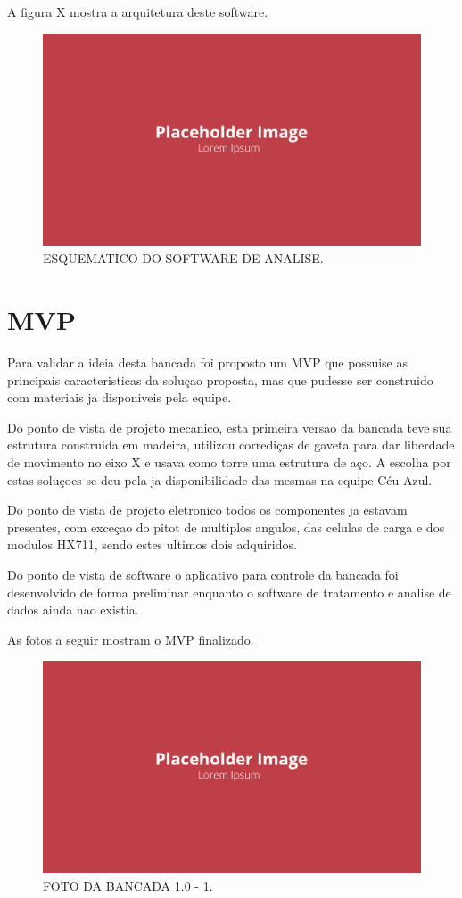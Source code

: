 A figura X mostra a arquitetura deste software.

\begin{figure}[!ht]
    \centering
    \includegraphics[width=.8\linewidth]{figuras/placeholder.png}
    \caption{ESQUEMATICO DO SOFTWARE DE ANALISE\cite{autor}.}
    \label{fig:placeholder}
\end{figure}

\section{MVP}

Para validar a ideia desta bancada foi proposto um MVP que possuise as principais caracteristicas da soluçao proposta, mas que pudesse ser construido com materiais ja disponiveis pela equipe.

Do ponto de vista de projeto mecanico, esta primeira versao da bancada teve sua estrutura construida em madeira, utilizou corrediças de gaveta para dar liberdade de movimento no eixo X e usava como torre uma estrutura de aço. A escolha por estas soluçoes se deu pela ja disponibilidade das mesmas na equipe Céu Azul.

Do ponto de vista de projeto eletronico todos os componentes ja estavam presentes, com exceçao do pitot de multiplos angulos, das celulas de carga e dos modulos HX711, sendo estes ultimos dois adquiridos.

Do ponto de vista de software o aplicativo para controle da bancada foi desenvolvido de forma preliminar enquanto o software de tratamento e analise de dados ainda nao existia.

As fotos a seguir mostram o MVP finalizado.

\begin{figure}[!ht]
    \centering
    \includegraphics[width=.8\linewidth]{figuras/placeholder.png}
    \caption{FOTO DA BANCADA 1.0 - 1\cite{autor}.}
    \label{fig:placeholder}
\end{figure}

